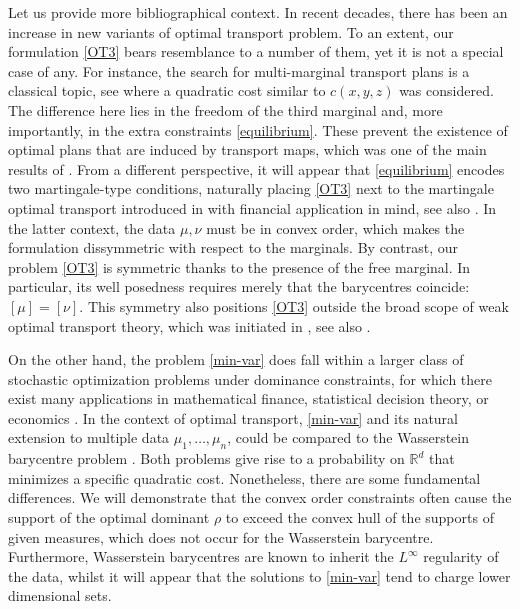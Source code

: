 \documentclass[11pt,letterpaper,reqno]{amsart}
\theoremstyle{definition}
\numberwithin{equation}{section}
\newcommand{\R}{\mathbb{R}}
\newcommand{\Rd}{\R^d}
\begin{document}
 \medskip
 
 

Let us provide more bibliographical context. In recent decades, there has been an increase in new variants of optimal transport problem. To an extent, our formulation \eqref{OT3} bears  resemblance to a number of them, yet it is not a special case of any. For instance, the search for multi-marginal transport plans is a classical topic,  see \cite{gangbo1998optimal} where a quadratic cost similar to $c(x,y,z)$ was considered. The difference here lies in the freedom of the third marginal and, more importantly, in the extra constraints \eqref{equilibrium}. These prevent the existence of optimal plans that are induced by transport maps, which was one of the main results of \cite{gangbo1998optimal}. From a different perspective, it will appear that \eqref{equilibrium} encodes two martingale-type conditions, naturally placing \eqref{OT3} next to the martingale optimal transport introduced in \cite{beiglbock2013} with financial application in mind, see also \cite{Ghoussoub,henry-labordere2017}. In the latter context, the data $\mu,\nu$ must be in convex order, which makes the formulation dissymmetric with respect to the marginals. By contrast, our problem  \eqref{OT3} is  symmetric thanks to the presence of the free marginal.
In particular,  its well posedness requires merely that the barycentres coincide: $[\mu]=[\nu]$. This symmetry also positions  \eqref{OT3} outside the broad scope of weak optimal transport theory, which was initiated in \cite{gozlan,ABC}, see also \cite{gozlan2020,backhoff-veraguas2022}. 



On the other hand, the problem \eqref{min-var} does fall within a larger class of stochastic optimization problems under dominance constraints, for which there exist many applications in mathematical finance, statistical decision theory, or economics \cite{Dentcheva2003,MulSca2006,Wiesel2023}.
In the context of optimal transport,  \eqref{min-var} and its natural extension to multiple data $\mu_1,\ldots, \mu_n$, could be compared to the Wasserstein barycentre problem \cite{agueh2011barycenters}. Both problems give rise to a probability on $\Rd$ that minimizes a specific quadratic cost. Nonetheless, there are some fundamental differences. We will demonstrate that the convex order constraints often cause the support of the optimal dominant $\rho$ to exceed the convex hull of the supports of given measures, which does not occur for the Wasserstein barycentre. Furthermore, Wasserstein barycentres are known to inherit  the $L^\infty$ regularity of the data, whilst it will appear that the solutions to \eqref{min-var} tend to charge lower dimensional sets.
\end{document}
